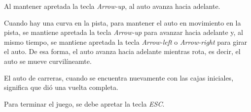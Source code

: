 \documentclass[letterpaper,11pt,oneside]{article}
\begin{document}
\begin{enumerate}
        Al mantener apretada la tecla \textit{Arrow-up}, al auto avanza hacia adelante.

        Cuando hay una curva en la pista, para mantener el auto en movimiento en la pista, se mantiene apretada la tecla \textit{Arrow-up} para avanzar hacia adelante y, al mismo tiempo, se mantiene apretada la tecla \textit{Arrow-left} o \textit{Arrow-right} para girar el auto. De esa forma, el auto avanza hacia adelante mientras rota, es decir, el auto se mueve curvilíneamte. 

        El auto de carreras, cuando se encuentra nuevamente con las cajas iniciales, significa que dió una vuelta completa.

        Para terminar el juego, se debe apretar la tecla \textit{ESC}.

\end{enumerate}


\end{document}
